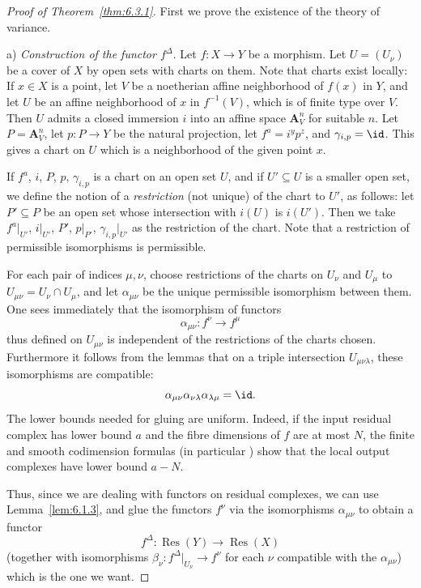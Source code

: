 \begin{proof}[Proof of Theorem~\ref{thm:6.3.1}]
\begingroup
\setlength{\emergencystretch}{2em}
First we prove the existence of the theory of variance.

\medskip{}\label{construction:6.3.a}\noindent a) \textit{Construction of the functor $f^{\Delta}$}. Let $f\colon X\to Y$ be a morphism. Let $U = (U_{\nu})$ be a cover of $X$ by open sets with charts on them. Note that charts exist locally: If $x\in X$ is a point, let $V$ be a noetherian affine neighborhood of $f(x)$ in $Y$, and let $U$ be an affine neighborhood of $x$ in $f^{-1}(V)$, which is of finite type over $V$. Then $U$ admits a closed immersion $i$ into an affine space $\mathbf{A}_{V}^{n}$ for suitable $n$. Let $P=\mathbf{A}_{V}^{n}$, let $p\colon P\to Y$ be the natural projection, let $f^{a}=i^{y}p^{z}$, and $\gamma_{i,p}=\id$. This gives a chart on $U$ which is a neighborhood of the given point $x$.

If $f^{a}$, $i$, $P$, $p$, $\gamma_{i,p}$ is a chart on an open set $U$, and if $U'\subseteq U$ is a smaller open set, we define the notion of a \emph{restriction} (not unique) of the chart to $U'$, as follows: let $P'\subseteq P$ be an open set whose intersection with $i(U)$ is $i(U')$. Then we take $f^{a}|_{U'}$, $i|_{U'}$, $P'$, $p|_{P'}$, $\gamma_{i,p}|_{U'}$ as the restriction of the chart. Note that a restriction of permissible isomorphisms is permissible.

For each pair of indices $\mu,\nu$, choose restrictions of the charts on $U_{\nu}$ and $U_{\mu}$ to $U_{\mu\nu}=U_{\nu}\cap U_{\mu}$, and let $\alpha_{\mu\nu}$ be the unique permissible isomorphism between them. One sees immediately that the isomorphism of functors
\[
\alpha_{\mu\nu}\colon f^{\nu}\longrightarrow f^{\mu}
\]
thus defined on $U_{\mu\nu}$ is independent of the restrictions of the charts chosen. Furthermore it follows from the lemmas that on a triple intersection $U_{\mu\nu\lambda}$, these isomorphisms are compatible:
\[
\alpha_{\mu\nu}\alpha_{\nu\lambda}\alpha_{\lambda\mu} = \id.
\]
The lower bounds needed for gluing are uniform. Indeed, if the input residual complex has lower bound $a$ and the fibre dimensions of $f$ are at most $N$, the finite and smooth codimension formulas (in particular ) show that the local output complexes have lower bound $a-N$.

Thus, since we are dealing with functors on residual complexes, we can use Lemma~\ref{lem:6.1.3}, and glue the functors $f^{\nu}$ via the isomorphisms $\alpha_{\mu\nu}$ to obtain a functor
\[
f^{\Delta}\colon \operatorname{Res}(Y)\longrightarrow \operatorname{Res}(X)
\]
(together with isomorphisms $\beta_{\nu}\colon f^{\Delta}|_{U_{\nu}}\to f^{\nu}$ for each $\nu$ compatible with the $\alpha_{\mu\nu}$) which is the one we want.


\end{proof}
